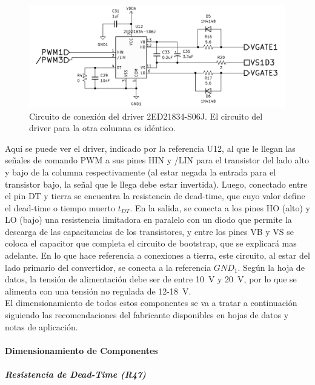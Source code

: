 \begin{figure}[h]
    \centering
    \includegraphics[scale=0.95]{Imagenes/Circuito Driver.png}
    \caption{Circuito de conexión del driver 2ED21834-S06J. El circuito del driver para la otra columna es idéntico.}
    \label{circuito_driver}
\end{figure}

Aquí se puede ver el driver, indicado por la referencia U12, al que le llegan las señales de comando PWM a sus pines HIN y /LIN para el transistor del lado alto y bajo de la columna respectivamente (al estar negada  la entrada para el transistor bajo, la señal que le llega debe estar invertida). Luego, conectado entre el pin DT y tierra se encuentra la resistencia de dead-time, que cuyo valor define el dead-time o tiempo muerto $t_{DT}$. En la salida, se conecta a los pines HO (alto) y LO (bajo) una resistencia limitadora en paralelo con un diodo que permite la descarga de las capacitancias de los transistores, y entre los pines VB y VS se coloca el capacitor que completa el circuito de bootstrap, que se explicará mas adelante. En lo que hace referencia a conexiones a tierra, este circuito, al estar del lado primario del convertidor, se conecta a la referencia $GND_1$. Según la hoja de datos, la tensión de alimentación debe ser de entre \SI[]{10}[]{\volt} y \SI[]{20}[]{\volt}, por lo que se alimenta con una tensión no regulada de \num{12}-\SI[]{18}[]{\volt}.\\

El dimensionamiento de todos estos componentes se va a tratar a continuación siguiendo las recomendaciones del fabricante disponibles en hojas de datos y notas de aplicación.\\

\paragraph{Dimensionamiento de Componentes}

\subparagraph{Resistencia de Dead-Time (R47)}

